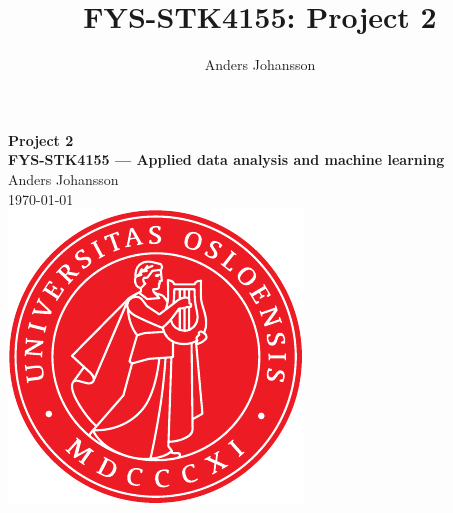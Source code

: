 \documentclass[11pt,british,a4paper]{article}
\numberwithin{equation}{section}
\begin{document}
\tikzexternaldisable
\title{FYS-STK4155: Project 2}
\author{Anders Johansson}

\begin{titlepage}
\vspace*{\fill}
\begin{center}
\textsf{
    \Huge \textbf{Project 2}\\\vspace{0.5cm}
    \Large \textbf{FYS-STK4155 --- Applied data analysis and machine learning}\\
    \vspace{8cm}
    Anders Johansson\\
    \today\\
}
\vspace{1.5cm}
\includegraphics{uio.pdf}\\
\vspace*{\fill}
\end{center}
\end{titlepage}
\null
\pagestyle{empty}
\end{document}
